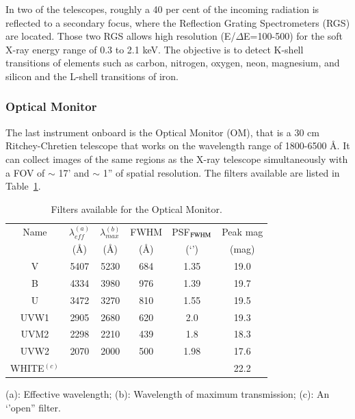 In two of the telescopes, roughly a 40 per cent of the incoming radiation is reflected to a secondary focus, where the Reflection Grating Spectrometers (RGS) are located. Those two RGS allows high resolution (E/$\Delta$E=100-500) for the soft X-ray energy range of 0.3 to 2.1 keV. The objective is to detect K-shell transitions of elements such as carbon, nitrogen, oxygen, neon, magnesium, and silicon and the L-shell transitions of iron. 

\subsubsection{Optical Monitor}
\label{sec2:om}


The last instrument onboard is the Optical Monitor (OM), that is a 30 cm Ritchey-Chretien telescope that works on the wavelength range of 1800-6500 \AA. It can collect images of the same regions as the X-ray telescope simultaneously with a FOV of $\sim$ 17' and $\sim$ 1'' of spatial resolution. The filters available are listed in Table~\ref{tab2:om}.

\begin{table}
\begin{center}
\caption{Filters available for the Optical Monitor.}
\begin{tabular}{|c|c|c|c|c|c|}
\hline
Name & $\lambda_{eff}^{(a)}$ & $\lambda_{max}^{(b)}$ &  FWHM  & PSF$_{\rm FWHM}$  & Peak mag \\ 
   &  (\AA) & (\AA) &  (\AA)  & (‘')  & (mag) \\ 
\hline
V	 & 5407 & 5230 & 684 & 	1.35 & 19.0   \\ \hline
B	 & 4334 & 3980 & 976 & 	1.39 & 19.7   \\ \hline
U	 & 3472 & 3270 & 810 & 	1.55 & 19.5   \\ \hline
UVW1	 & 2905 & 2680 & 620	 & 2.0 & 19.3   \\ \hline
UVM2	 & 2298 & 2210 & 439	 & 1.8 & 18.3   \\ \hline
UVW2	 & 2070 & 2000 & 500	 & 1.98 & 17.6  \\ \hline
WHITE$^{(c)}$ &   &   &   &  & 22.2 \\ 
\hline
\end{tabular}

 (a): Effective wavelength; (b): Wavelength of maximum transmission; (c): An ‘'open'' filter.

\label{tab2:om}
\end{center}
\end{table}



